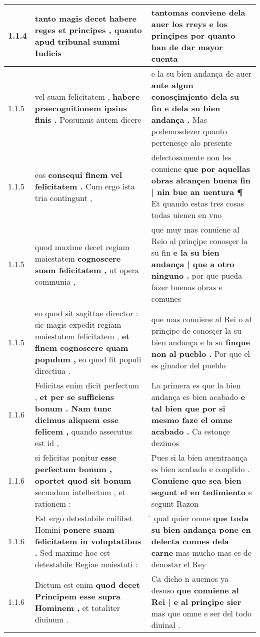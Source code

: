 \begin{tabular}{|p{1cm}|p{6.5cm}|p{6.5cm}|}
1.1.4 & tanto magis decet \textbf{ habere reges et principes , } quanto apud tribunal summi Iudicis & tantomas conviene dela auer los rreys \textbf{ e los prinçipes } por quanto han de dar mayor cuenta \\\hline
1.1.5 & vel suam felicitatem , \textbf{ habere praecognitionem ipsius finis . } Possumus autem dicere & e la su bien andança de auer \textbf{ ante algun conosçimjento dela su fin e dela su bien andança . } Mas podemosdezer quanto pertenesçe alo presente \\\hline
1.1.5 & eos \textbf{ consequi finem vel felicitatem . } Cum ergo ista tria contingunt , & delectosamente non les conuiene \textbf{ que por aquellas obras alcançen buena fin | nin bue an uentura ¶ } Et quando estas tres cosas todas uienen en vno \\\hline
1.1.5 & quod maxime decet regiam maiestatem \textbf{ cognoscere suam felicitatem , } ut opera communia , & que muy mas conuiene al Reio al prinçipe conosçer la su fin \textbf{ e la su bien andança | que a otro ninguno . } por que pueda fazer buenas obras e comunes \\\hline
1.1.5 & eo quod sit sagittae director : sic magis expedit regiam maiestatem felicitatem , \textbf{ et finem cognoscere quam populum , } eo quod fit populi directiua . & que mas conuiene al Rei o al prinçipe de conosçer la su bien andança e la su \textbf{ finque non al pueblo . } Por que el es ginador del pueblo \\\hline
1.1.6 & Felicitas enim dicit perfectum , \textbf{ et per se sufficiens bonum . Nam tunc dicimus aliquem esse felicem , } quando assecutus est id , & La primera es que la bien andança es bien acabado \textbf{ e tal bien que por si mesmo faze el omne acabado . } Ca estonçe dezimos \\\hline
1.1.6 & si felicitas ponitur \textbf{ esse perfectum bonum , oportet quod sit bonum } secundum intellectum , et rationem : & Pues si la bien auentraança es bien acabado e conplido . \textbf{ Conuiene que sea bien segunt el en tedimiento } e segunt Razon \\\hline
1.1.6 & Est ergo detestabile cuilibet Homini \textbf{ ponere suam felicitatem in voluptatibus . } Sed maxime hoc est detestabile Regiae maiestati : & ̉ qual quier omne \textbf{ que toda su bien andança pone en delecta connes dela carne } mas mucho mas es de denostar el Rey \\\hline
1.1.6 & Dictum est enim \textbf{ quod decet Principem esse supra Hominem , } et totaliter diuinum . & Ca dicho n auemos ya desuso \textbf{ que conuiene al Rei | e al prinçipe sier } mas que omne e ser del todo diuinal . \\\hline

\end{tabular}
